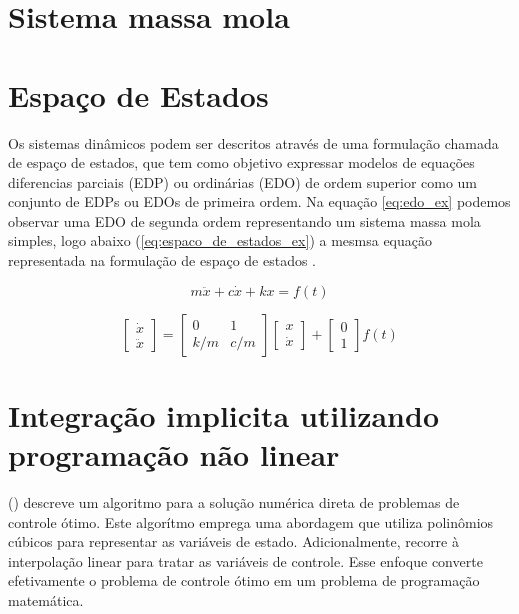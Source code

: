 \section{Sistema massa mola}

\section{Espaço de Estados}

Os sistemas dinâmicos podem ser descritos através de uma formulação
chamada de espaço de estados, que tem como objetivo expressar modelos 
de equações diferencias parciais (EDP) ou ordinárias (EDO) de ordem superior
como um conjunto de EDPs ou EDOs de primeira ordem.
Na equação \ref{eq:edo_ex} podemos observar uma EDO de segunda ordem representando
um sistema massa mola simples,
logo abaixo (\ref{eq:espaco_de_estados_ex}) a mesmsa equação representada na formulação
de espaço de estados \cite{hamilton94}.

\begin{equation}
    \label{eq:edo_ex}
    m \ddot x+c \dot x+kx = f(t)
\end{equation}

\begin{equation}
    \label{eq:espaco_de_estados_ex}
    \begin{bmatrix}
        \dot x \\
        \ddot x
    \end{bmatrix}
    =
    \begin{bmatrix}
        0 & 1 \\
        k/m & c/m
    \end{bmatrix}
    \begin{bmatrix}
        x \\
        \dot x
    \end{bmatrix}
    +
    \begin{bmatrix}
        0 \\
        1
    \end{bmatrix}
    f(t)
\end{equation}

\section{Integração implicita utilizando programação não linear}

\citeauthor{hargraves87} (\citeyear{hargraves87}) descreve um algoritmo para a solução numérica direta de problemas de controle ótimo. 
Este algorítmo emprega uma abordagem que utiliza polinômios cúbicos para representar as variáveis de estado. Adicionalmente, recorre à interpolação linear para tratar as variáveis de controle. 
Esse enfoque converte efetivamente o problema de controle ótimo em um problema de programação matemática.

